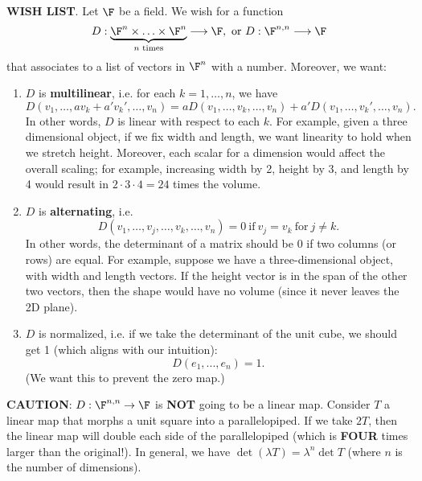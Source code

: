 \documentclass[math0540-lecture-notes.tex]{subfiles}
\begin{document}
\textbf{WISH LIST}. Let $\F$ be a field. We wish for a function \[
  D: \underbrace{\F^{n}\times \ldots\times \F^{n}}_\text{$n$ times}\longrightarrow \F, ~\text{or}~
  D:\F^{n,n}\longrightarrow \F
\] that associates to a list of vectors in $\F^n$ with a number. Moreover, we want:
\begin{enumerate}
  \item $D$ is \textbf{multilinear}, i.e. for each $k=1,\ldots,n$, we have \[
        D(v_1,\ldots,av_k+a'v_k',\ldots,v_n)=aD(v_1,\ldots,v_k,\ldots,v_n)+a'D(v_1,\ldots,v_k',\ldots,v_n)
    .\] In other words, $D$ is linear with respect to each $k$. For example, given a three
    dimensional object, if we fix width and length, we want linearity to hold when we stretch
    height. Moreover, each scalar for a dimension would affect the overall scaling; for example,
    increasing width by 2, height by 3, and length by 4 would result in $2\cdot 3\cdot 4=24$ times
    the volume.
  \item $D$ is \textbf{alternating}, i.e. \[
      D(v_1,\ldots,v_j,\ldots,v_k,\ldots,v_n)=0 ~\text{if}~ v_j=v_k ~\text{for}~ j\neq k
    .\] In other words, the determinant of a matrix should be $0$ if two columns (or rows) are equal.
    For example, suppose we have a three-dimensional object, with width and length vectors. If the
    height vector is in the span of the other two vectors, then the shape would have no volume (since
    it never leaves the 2D plane).
  \item $D$ is normalized, i.e. if we take the determinant of the unit cube, we should get 1 (which
    aligns with our intuition): \[
    D(e_1,...,e_n)=1
  .\] (We want this to prevent the zero map.)
\end{enumerate}

\begin{remark}
  \textbf{CAUTION}: $D:\F^{n,n}\to \F$ is \textbf{NOT} going to be a linear map. Consider $T$ a
  linear map that morphs a unit square into a parallelopiped. If we take $2T$, then the linear map
  will double each side of the parallelopiped (which is \textbf{FOUR} times larger than the
  original!). In general, we have $\det{(\lambda T)}=\lambda^n\det{T}$ (where $n$ is the number of
  dimensions).
\end{remark}
\end{document}
